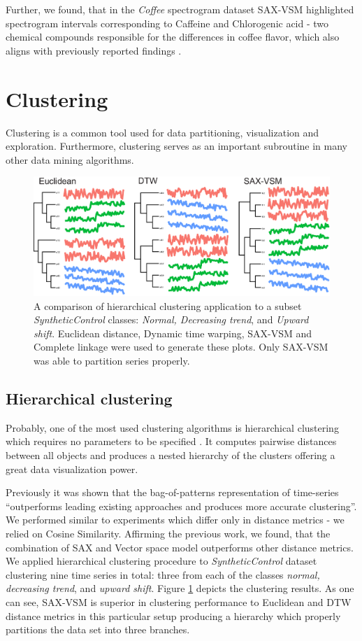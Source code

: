 \documentclass{llncs}
\newcommand{\myfigureshrinker}{\vspace{-1cm}}
\begin{document}
Further, we found, that in the \textit{Coffee} spectrogram dataset SAX-VSM highlighted spectrogram
intervals corresponding to Caffeine and Chlorogenic acid - two chemical compounds responsible for
the differences in coffee flavor, which also aligns with previously reported findings \cite{coffee}.
\section{Clustering}
Clustering is a common tool used for data partitioning, visualization and exploration. Furthermore, 
clustering serves as an important subroutine in many other data mining algorithms.
\begin{figure}[t]
   \myfigureshrinker
   \centering
   \includegraphics[width=115mm]{figures/clustering.eps}
   \caption{A comparison of hierarchical clustering application to a subset 
\textit{SyntheticControl} classes: \textit{Normal, Decreasing trend}, and \textit{Upward shift}. 
Euclidean distance, Dynamic time warping, SAX-VSM and Complete linkage were used to 
generate these plots. Only SAX-VSM was able to partition series properly.                           
   }
   \label{fig:hc}
\end{figure}
\subsection{Hierarchical clustering}
Probably, one of the most used clustering algorithms is hierarchical clustering which requires no
parameters to be specified \cite{hcs}. It computes pairwise distances between all objects and 
produces a nested hierarchy of the clusters offering a great data visualization power. 

Previously it was shown  \cite{bag_patterns} that the bag-of-patterns 
representation of time-series ``outperforms leading existing approaches and produces more 
accurate clustering''. 
We performed similar to \cite{bag_patterns} experiments which differ only in distance metrics - 
we relied on Cosine Similarity. Affirming the previous work, we found, that the combination of 
SAX and Vector space model outperforms other distance metrics. We applied 
hierarchical clustering procedure to \textit{SyntheticControl} dataset clustering
nine time series in total: three from each of the classes \textit{normal, decreasing trend}, and 
\textit{upward shift}. Figure \ref{fig:hc} depicts the clustering results. 
As one can see, SAX-VSM is superior in clustering performance to Euclidean and DTW distance 
metrics in this particular setup producing a hierarchy which properly partitions the data set 
into three branches.
\end{document}
